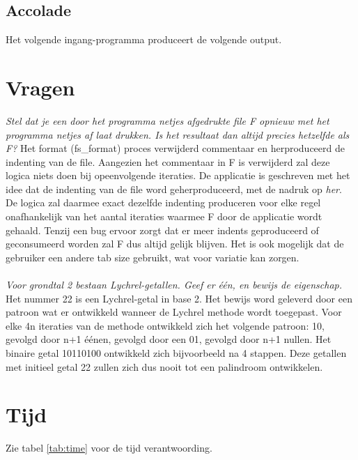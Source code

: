 \documentclass[10pt]{article}
\begin{document}
\subsection{Accolade}
Het volgende ingang-programma produceert de volgende output.



\section{Vragen}
\textit{Stel dat je een door het programma netjes afgedrukte file F opnieuw met het programma netjes af laat drukken.
      Is het resultaat dan altijd precies hetzelfde als F?}
\newline Het format (fs\_format) proces verwijderd commentaar en herproduceerd de indenting van de file.
Aangezien het commentaar in F is verwijderd zal deze logica niets doen bij opeenvolgende iteraties.
De applicatie is geschreven met het idee dat de indenting van de file word geherproduceerd,
met de nadruk op \textit{her}. De logica zal daarmee exact dezelfde indenting produceren voor elke
regel onafhankelijk van het aantal iteraties waarmee F door de applicatie wordt gehaald.
Tenzij een bug ervoor zorgt dat er meer indents geproduceerd of geconsumeerd worden zal
F dus altijd gelijk blijven. Het is ook mogelijk dat de gebruiker een andere tab size gebruikt,
wat voor variatie kan zorgen.
\\ \hfill \\
\textit{Voor grondtal 2 bestaan Lychrel-getallen. Geef er één, en bewijs de eigenschap.}
\newline
Het nummer 22 is een Lychrel-getal in base 2. Het bewijs word geleverd door een patroon wat er ontwikkeld wanneer de
Lychrel methode wordt toegepast. Voor elke 4n iteraties van de methode ontwikkeld zich het volgende patroon: 10,
gevolgd door n+1 éénen, gevolgd door een 01, gevolgd door n+1 nullen. Het binaire getal 10110100 ontwikkeld zich
bijvoorbeeld na 4 stappen. Deze getallen met initieel getal 22 zullen zich dus nooit tot een palindroom ontwikkelen.

\newpage
\section{Tijd}
Zie tabel \ref{tab:time} voor de tijd verantwoording.
\end{document}

